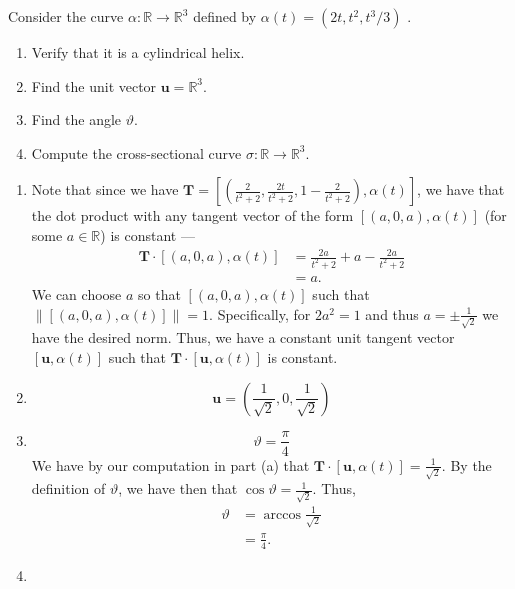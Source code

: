 \documentclass[12 pt, letterpaper]{hmcpset}
\begin{document}
\begin{problem}[Problem 4.]
	Consider the curve $\alpha : \mathbb{R} \to \mathbb{R}^{3}$  defined by $\alpha(t) = (2t, t^{2}, t^{3}/3)$ .
	\begin{enumerate}
		\item Verify that it is a cylindrical helix.
		\item Find the unit vector $\mathbf{u} = \mathbb{R}^{3}$.
		\item Find the angle $\vartheta$.
		\item Compute the cross-sectional curve $\sigma : \mathbb{R} \to \mathbb{R}^{3}$.
	\end{enumerate}
\end{problem}

\begin{solution}
	\begin{enumerate}
		\item Note that since we have $\mathbf{T} = \left [ \left ( \frac{2}{t^{2} + 2}, \frac{2t}{t^{2} + 2}, 1 - \frac{2}{t^{2} + 2} \right ), \alpha(t) \right ]$, we have that the dot product with any tangent vector of the form $[(a, 0, a), \alpha(t)]$ (for some $a \in \mathbb{R}$) is constant ---
			\[
				\begin{split}
					\mathbf{T} \cdot [(a, 0, a), \alpha(t)] & = \frac{2a}{t^{2} + 2} + a - \frac{2a}{t^{2} + 2} \\
										& = a.
				\end{split}
			\]
		We can choose $a$ so that $[(a, 0, a), \alpha(t)]$ such that $\lVert [(a, 0, a), \alpha(t)] \rVert = 1$. Specifically, for $2a^{2} = 1$ and thus $a = \pm \frac{1}{\sqrt 2}$ we have the desired norm. Thus, we have a constant unit tangent vector $[\mathbf{u}, \alpha(t)]$ such that $\mathbf{T} \cdot [\mathbf{u}, \alpha(t)]$ is constant.
		\item 
			\[
				\boxed{
				\mathbf{u} = \left ( \frac{1}{\sqrt 2}, 0, \frac{1}{\sqrt 2} \right )
				}
			\]
		\item 
			\[
				\boxed{
					\vartheta = \frac{\pi}{4}
				}
			\] 
			We have by our computation in part (a) that $\mathbf{T} \cdot [\mathbf{u}, \alpha(t)] = \frac{1}{\sqrt 2}$. By the definition of $\vartheta$, we have then that $\cos{\vartheta} = \frac{1}{\sqrt 2}$. Thus,
			\[
				\begin{split}
					\vartheta & = \arccos{\frac{1}{\sqrt 2}} \\
						  & = \frac{\pi}{4}.
				\end{split}
			\]
		\item

\end{enumerate}
\end{solution}
\end{document}
